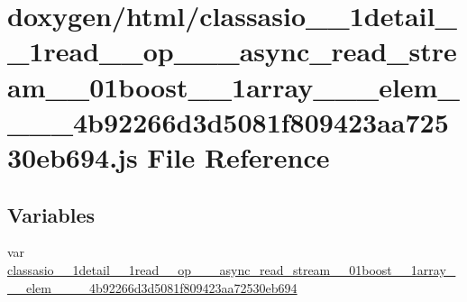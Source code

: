 \hypertarget{classasio__1__1detail__1__1read____op__3__01__async__read__stream__00__01boost__1__1array__3__01969bee7580e764758ac65e6c12d4de70}{}\section{doxygen/html/classasio\+\_\+\_\+1detail\+\_\+\_\+1read\+\_\+\+\_\+op\+\_\+\_\+\_\+async\+\_\+read\+\_\+stream\+\_\+\_\+01boost\+\_\+\_\+1array\+\_\+\_\+\_\+elem\+\_\+\_\+\_\+\_\+4b92266d3d5081f809423aa72530eb694.js File Reference}
\label{classasio__1__1detail__1__1read____op__3__01__async__read__stream__00__01boost__1__1array__3__01969bee7580e764758ac65e6c12d4de70}
\subsection*{Variables}
\begin{DoxyCompactItemize}
\item 
var \hyperlink{classasio__1__1detail__1__1read____op__3__01__async__read__stream__00__01boost__1__1array__3__01969bee7580e764758ac65e6c12d4de70_a6bba6a1e7cfd9c5b45054d538205b2fc}{classasio\+\_\+\_\+1detail\+\_\+\_\+1read\+\_\+\+\_\+op\+\_\+\_\+\_\+async\+\_\+read\+\_\+stream\+\_\+\_\+01boost\+\_\+\_\+1array\+\_\+\_\+\_\+elem\+\_\+\_\+\_\+\_\+4b92266d3d5081f809423aa72530eb694}
\end{DoxyCompactItemize}



